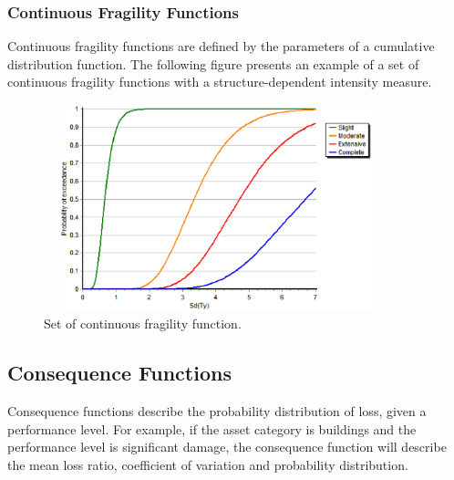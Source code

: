 \subsubsection{Continuous Fragility Functions}
Continuous fragility functions are defined by the parameters of a cumulative distribution function. The following figure presents an example of a set of continuous fragility functions with a structure-dependent intensity measure.

\begin{figure}[ht]
\centering
\includegraphics[width=10cm,height=6cm]{./Figures/Part_Risk/FFContinuous.eps}
\caption{Set of continuous fragility function.}
\label{FFcontinuous}
\end{figure}

\subsection{Consequence Functions}
Consequence functions describe the probability distribution of loss, given a performance level. For example, if the asset category is buildings and the performance level is significant damage, the consequence function will describe the mean loss ratio, coefficient of variation and probability distribution.
